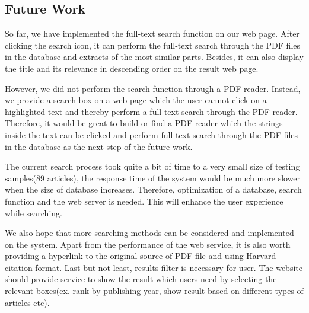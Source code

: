 
\subsection{Future Work}
So far, we have implemented the full-text search function on our web page. 
After clicking the search icon, it can perform the full-text search through the PDF files in the database and extracts of the most similar parts. 
Besides, it can also display the title and its relevance in descending order on the result web page.

However, we did not perform the search function through a PDF reader.
Instead, we provide a search box on a web page which the user cannot click on a highlighted text and thereby perform a full-text search through the PDF reader. 
Therefore, it would be great to build or find a PDF reader which the strings inside the text can be clicked and perform full-text search through the PDF files in the database as the next step of the future work.
 
The current search process took quite a bit of time to a very small size of testing samples(89 articles), the response time of the system would be much more slower when the size of database increases. 
Therefore, optimization of a database, search function and the web server is needed. 
This will enhance the user experience while searching.
 
We also hope that more searching methods can be considered and implemented on the system. 
Apart from the performance of the web service, it is also worth providing a hyperlink to the original source of PDF file and using Harvard citation format.
Last but not least, results filter is necessary for user. 
The website should provide service to show the result which users need by selecting the relevant boxes(ex. rank by publishing year, show result based on different types of articles etc).


